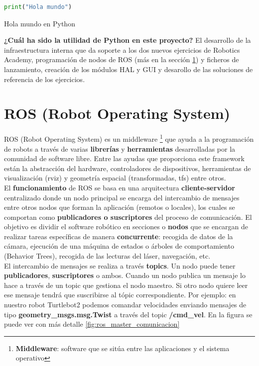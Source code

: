 \begin{code}[H]
\begin{lstlisting}[language=Python]
print("Hola mundo")
\end{lstlisting}
\caption[Hola mundo en Python]{Hola mundo en Python}
\label{cod:holamundo_python}
\end{code}

\textbf{¿Cuál ha sido la utilidad de Python en este proyecto?} El desarrollo de la infraestructura interna que da soporte a los dos nuevos ejercicios de Robotics Academy, programación de nodos de ROS (más en la sección \ref{sec:ros}) y ficheros de lanzamiento, creación de los módulos HAL y GUI y desarollo de las soluciones de referencia de los ejercicios.\\




\section{ROS (Robot Operating System)}
\label{sec:ros}
ROS (Robot Operating System) \cite{ROS} es un middleware \footnote{\textbf{Middleware}: software que se sitúa entre las aplicaciones y el sistema operativo} que ayuda a la programación de robots a través de varias \textbf{librerías} y \textbf{herramientas} desarrolladas por la comunidad de software libre. Entre las ayudas que proporciona este framework están la abstracción del hardware, controladores de dispositivos, herramientas de visualización (rviz) y geometría espacial (transformadas, tfs) entre otros.\\

El \textbf{funcionamiento} de ROS se basa en una arquitectura \textbf{cliente-servidor} centralizado donde un nodo principal se encarga del intercambio de mensajes entre otros nodos que forman la aplicación (remotos o locales), los cuales se comportan como \textbf{publicadores o suscriptores} del proceso de comunicación. El objetivo es dividir el software robótico en secciones o \textbf{nodos} que se encargan de realizar tareas específicas de manera \textbf{concurrente}: recogida de datos de la cámara, ejecución de una máquina de estados o árboles de comportamiento (Behavior Trees), recogida de las lecturas del láser, navegación, etc.\\

El intercambio de mensajes se realiza a través \textbf{topics}. Un nodo puede tener \textbf{publicadores}, \textbf{suscriptores} o ambos. Cuando un nodo publica un mensaje lo hace a través de un topic que gestiona el nodo maestro. Si otro nodo quiere leer ese mensaje tendrá que suscribirse al tópic correspondiente. Por ejemplo: en nuestro robot Turtlebot2 podemos comandar velocidades enviando mensajes de tipo \textbf{geometry\_msgs.msg.Twist} a través del topic \textbf{/cmd\_vel}. En la figura se puede ver con más detalle \ref{fig:ros_master_comunicacion}\\

